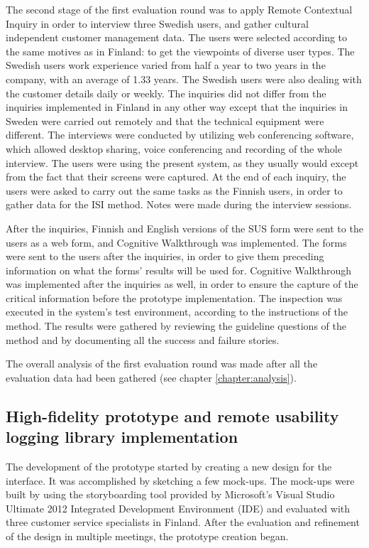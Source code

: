 \documentclass[12pt,a4paper,oneside,pdftex]{report}
\begin{document}
The second stage of the first evaluation round was to apply Remote Contextual Inquiry in order to interview three Swedish users, and gather cultural independent customer management data. The users were selected according to the same motives as in Finland: to get the viewpoints of diverse user types. The Swedish users work experience varied from half a year to two years in the company, with an average of 1.33 years. The Swedish users were also dealing with the customer details daily or weekly. The inquiries did not differ from the inquiries implemented in Finland in any other way except that the inquiries in Sweden were carried out remotely and that the technical equipment were different. The interviews were conducted by utilizing web conferencing software, which allowed desktop sharing, voice conferencing and recording of the whole interview. The users were using the present system, as they usually would except from the fact that their screens were captured. At the end of each inquiry, the users were asked to carry out the same tasks as the Finnish users, in order to gather data for the ISI method. Notes were made during the  interview sessions.

After the inquiries, Finnish and English versions of the SUS form were sent to the users as a web form, and Cognitive Walkthrough was implemented. The forms were sent to the users after the inquiries, in order to give them preceding information on what the forms' results will be used for. Cognitive Walkthrough was implemented after the inquiries as well, in order to ensure the capture of the critical information before the prototype implementation. The inspection was executed in the system's test environment, according to the instructions of the method. The results were gathered by reviewing the guideline questions of the method and by documenting all the success and failure stories. 

The overall analysis of the first evaluation round was made after all the evaluation data had been gathered  (see chapter \ref{chapter:analysis}). 

\subsection{High-fidelity prototype and remote usability logging library implementation}

The development of the prototype started by creating a new design for the interface. It was accomplished by sketching a few mock-ups. The mock-ups were built by using the storyboarding tool provided by Microsoft's Visual Studio Ultimate 2012 Integrated Development Environment (IDE) and evaluated with three customer service specialists in Finland. After the evaluation and refinement of the design in multiple meetings, the prototype creation began.
\end{document}
